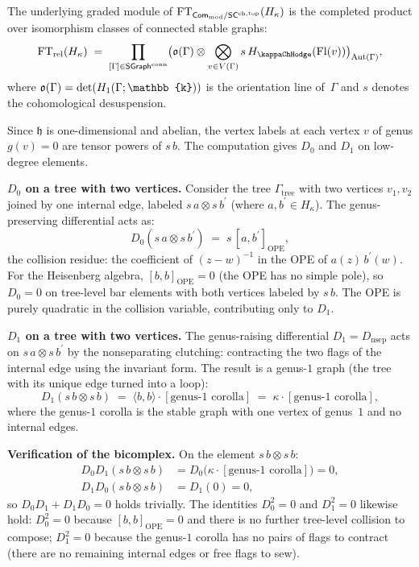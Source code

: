 \begin{example}
\label{ex:rft-heisenberg}
The underlying graded module of
$\mathrm{FT}_{\mathsf{Com}_{\mathrm{mod}} / \mathsf{SC}^{\mathrm{ch,top}}}(H_\kappa)$ is the
completed product over isomorphism classes of connected stable
graphs:
\[
\FT_{\mathrm{rel}}(H_\kappa) \;=\;
\prod_{[\Gamma] \in \StGraph^{\mathrm{conn}}}
\bigl(\orline(\Gamma) \otimes
\bigotimes_{v \in V(\Gamma)} s\, H_{\kappaChHodge}(\mathrm{Fl}(v))
\bigr)_{\Aut(\Gamma)},
\]
where $\orline(\Gamma) = \det(H_1(\Gamma;\mathbb{k}))$ is the
orientation line of~$\Gamma$ and $s$ denotes the cohomological
desuspension.

Since $\mathfrak{h}$ is one-dimensional and abelian, the vertex
labels at each vertex $v$ of genus $g(v) = 0$ are tensor powers
of $s\,b$. The computation gives $D_0$ and $D_1$ on low-degree elements.

\smallskip\noindent
\textbf{$D_0$ on a tree with two vertices.}
Consider the tree $\Gamma_{\mathrm{tree}}$ with two vertices
$v_1, v_2$ joined by one internal edge, labeled
$s\,a \otimes s\,b^\prime$ (where $a, b^\prime \in H_\kappa$).
The genus-preserving differential acts as:
\[
D_0(s\,a \otimes s\,b^\prime)
\;=\;
s\,[a, b^\prime]_{\mathrm{OPE}},
\]
the collision residue: the coefficient of $(z-w)^{-1}$ in the
OPE of $a(z)\, b^\prime(w)$. For the Heisenberg algebra,
$[b, b]_{\mathrm{OPE}} = 0$ (the OPE has no simple pole), so
$D_0 = 0$ on tree-level bar elements with both vertices labeled
by $s\,b$. The OPE is purely quadratic in the collision
variable, contributing only to $D_1$.

\smallskip\noindent
\textbf{$D_1$ on a tree with two vertices.}
The genus-raising differential $D_1 = D_{\mathrm{nsep}}$ acts
on $s\,a \otimes s\,b^\prime$ by the nonseparating clutching:
contracting the two flags of the internal edge using the
invariant form. The result is a genus-$1$ graph (the tree
with its unique edge turned into a loop):
\[
D_1(s\,b \otimes s\,b)
\;=\;
\langle b, b \rangle \cdot [\text{genus-$1$ corolla}]
\;=\;
\kappa \cdot [\text{genus-$1$ corolla}],
\]
where the genus-$1$ corolla is the stable graph with one vertex
of genus~$1$ and no internal edges.

\smallskip\noindent
\textbf{Verification of the bicomplex.}
On the element $s\,b \otimes s\,b$:
\begin{align*}
D_0 D_1(s\,b \otimes s\,b)
&= D_0\bigl(\kappa \cdot [\text{genus-$1$ corolla}]\bigr)
= 0, \\
D_1 D_0(s\,b \otimes s\,b)
&= D_1(0)
= 0,
\end{align*}
so $D_0 D_1 + D_1 D_0 = 0$ holds trivially. The identities
$D_0^2 = 0$ and $D_1^2 = 0$ likewise hold: $D_0^2 = 0$
because $[b,b]_{\mathrm{OPE}} = 0$ and there is no further
tree-level collision to compose; $D_1^2 = 0$ because the
genus-$1$ corolla has no pairs of flags to contract (there are
no remaining internal edges or free flags to sew).


\end{example}
